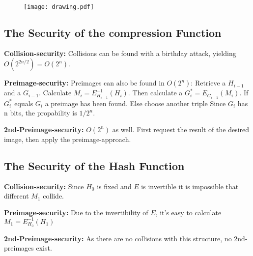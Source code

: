 \begin{figure}[H]
    \centering
    \texttt{[image: drawing.pdf]}
\end{figure}

\subsection{The Security of the compression Function}

\begin{description}
    \item \textbf{Collision-security:} Collisions can be found with a birthday attack, yielding $O(2^{2n/2}) = O(2^n)$.
    \item \textbf{Preimage-security:} Preimages can also be found in $O(2^n)$: Retrieve a $H_{i-1}$ and a $G_{i-1}$. Calculate $M_i = E_{H_{i-1}}^{-1}(H_i)$. Then calculate a $G_i^* = E_{G_{i-1}}(M_i)$. If $G_i^*$ equals $G_i$ a preimage has been found. Else choose another triple Since $G_i$ has n bits, the propability is $1/2^n$.
    \item \textbf{2nd-Preimage-security:} $O(2^n)$ as well. First request the result of the desired image, then apply the preimage-approach.
\end{description}

\subsection{The Security of the Hash Function}

\begin{description}
    \item \textbf{Collision-security:} Since $H_0$ is fixed and $E$ is invertible it is impossible that different $M_1$ collide.
    \item \textbf{Preimage-security:}  Due to the invertibility of $E$, it's easy to calculate $M_1 = E_{H_0}^{-1}(H_1)$
    \item \textbf{2nd-Preimage-security:} As there are no collisions with this structure, no 2nd-preimages exist.
\end{description}


